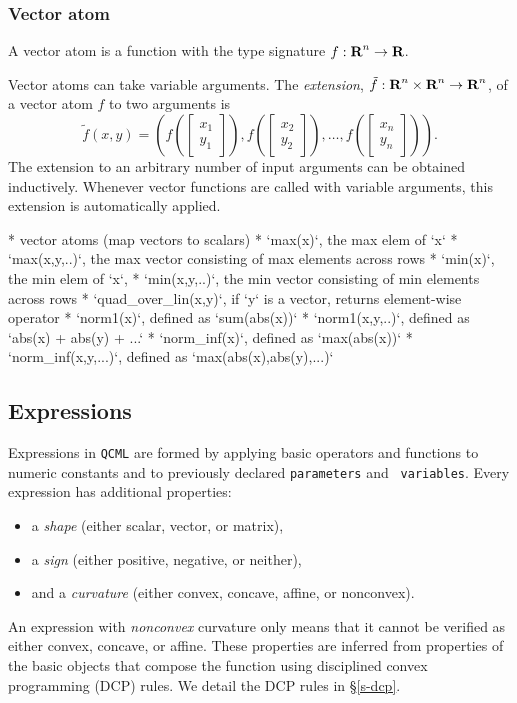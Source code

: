 \documentclass[11pt]{article}
\def\qcml{\texttt{QCML}\xspace}
\newcommand{\reals}{{\mbox{\bf R}}}
\begin{document}
\subsubsection{Vector atom}
A vector atom is a function with the type signature $f : \reals^n \to \reals$.


Vector atoms can take variable arguments. 
The \emph{extension}, $\tilde f : \reals^n \times \reals^n \to \reals^n$, of 
a vector atom $f$ to two arguments is
\[
\tilde f(x, y) = \left( f\left(\begin{bmatrix} x_1 \\ y_1 \end{bmatrix}\right), 
  f\left(\begin{bmatrix}x_2 \\ y_2 \end{bmatrix}\right), \ldots, 
  f\left(\begin{bmatrix}x_n \\ y_n\end{bmatrix}\right) \right).
\]
The extension to an arbitrary number of input arguments can be obtained inductively.
Whenever vector functions are called with variable arguments, this extension
is automatically applied.

* vector atoms (map vectors to scalars)
  * `max(x)`, the max elem of `x`
  * `max(x,y,..)`, the max vector consisting of max elements across rows
  * `min(x)`, the min elem of `x`,
  * `min(x,y,..)`, the min vector consisting of min elements across rows
  * `quad\_over\_lin(x,y)`, if `y` is a vector, returns element-wise operator
  * `norm1(x)`, defined as `sum(abs(x))`
  * `norm1(x,y,..)`, defined as `abs(x) + abs(y) + ...`
  * `norm\_inf(x)`, defined as `max(abs(x))`
  * `norm\_inf(x,y,...)`, defined as `max(abs(x),abs(y),...)`
  
\subsection{Expressions}
Expressions in \qcml are formed by applying basic operators and functions to
numeric constants and to previously declared {\tt parameters} and {\tt
variables}. Every expression has additional properties:
\begin{itemize}
\item a \emph{shape} (either scalar, vector, or matrix),
\item a \emph{sign} (either positive, negative, or neither),
\item and a \emph{curvature} (either convex, concave, affine, or nonconvex).
\end{itemize}
An expression with \emph{nonconvex} curvature only means that it cannot be verified as either convex, concave, or affine. These properties are inferred from properties of the basic objects that compose the function using disciplined convex programming (DCP) rules. We detail the DCP rules in \S\ref{s-dcp}.
\end{document}
